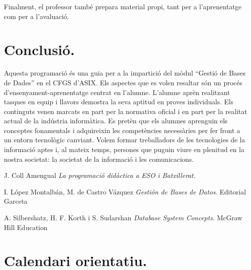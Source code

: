 \documentclass[catalan, a4paper, 12pt, titlepage]{article}
\begin{document}
Finalment, el professor també prepara material propi, tant per a l'aprenentatge com per a l'avaluació.

\section{Conclusió.}
\label{sec:conclusió}

Aquesta programació és una guia per a la impartició del mòdul ``Gestió de Bases de Dades'' en el CFGS d'ASIX.
Els aspectes que es volen resaltar són un procés d'ensenyament-aprenentatge centrat en l'alumne.
L'alumne aprèn realitzant tasques en equip i llavors demostra la seva aptitud en proves individuals.
Els continguts venen marcats en part per la normativa oficial i en part per la realitat actual de la indústria informàtica.
Es pretèn que els alumnes aprenguin els conceptes fonamentals i adquireixin les competències necessàries per fer front a un entorn tecnològic canviant.
Volem formar treballadors de les tecnologies de la informació aptes i, al mateix temps, persones que puguin viure en plenitud en la nostra societat:
la societat de la informació i les comunicacions.



\begin{thebibliography}{9}

J. Coll Amengual
\textit{La programació didàctica a ESO i Batxillerat}. 

I. López Montalbán, M. de Castro Vázquez
\textit{Gestión de Bases de Datos}. 
Editorial Garceta

A. Silbershatz, H. F. Korth i S. Sudarshan 
\textit{Database System Concepts}. 
McGraw Hill Education

\end{thebibliography}


\appendix

\section{Calendari orientatiu.}
\label{app:schedule}
\end{document}
